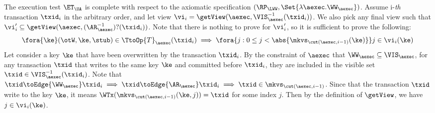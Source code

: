 The execution test $\ET_\UA$ is complete with respect to 
the axiomatic specification \( (\RP_{\LWW}, \Set{\lambda \aexec. \WW_\aexec }) \).
Assume i-\emph{th} transaction \( \txid_i \) in the arbitrary order,
and let view \( \vi_{i} = \getView(\aexec, \VIS^{-1}_{\aexec}(\txid_{i}) ) \).
We also pick any final view such that \( \vi'_{i} \subseteq \getView(\aexec, (\AR^{-1}_{\aexec})?(\txid_{i}) ) \).
Note that there is nothing to prove for \( \vi'_i \),
so it is sufficient to prove the following:
\[
    \fora{\ke} (\otW, \ke, \stub) \in \TtoOp{T}_{\aexec}(\txid_{i}) 
    \implies 
    \fora{j : 0 \leq j < \abs{\mkvs_{\cut(\aexec, i-1)}(\ke)}} j \in \vi_i(\ke)
\]
Let consider a key \( \ke \) that have been overwritten by the transaction \( \txid_i \).
By the constraint of \( \aexec \) that \( \WW_\aexec \subseteq \VIS_\aexec \),
for any transaction \( \txid \) that writes to the same key \( \ke \) and committed before \( \txid_i \), 
they are included in the visible set \(\txid \in \VIS^{-1}_{\aexec}(\txid_{i}) \).
Note that \( \txid \toEdge{\WW_\aexec} \txid_i \implies \txid \toEdge{\AR_\aexec} \txid_i \implies \txid \in \mkvs_{\cut(\aexec,i-1)}\).
Since that the transaction \( \txid \) write to the key \( \ke \),
it means \( \WTx(\mkvs_{\cut(\aexec, i-1)}(\ke,j)) = \txid \) for some index \( j \).
Then by the definition of \( \getView \), we have \( j \in \vi_i(\ke)\).
